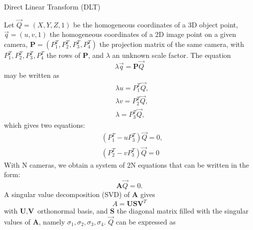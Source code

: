 \begin{algorithm}[!ht]
      \caption{Direct Linear Transform (DLT)}\label{alg:dlt}
      \begin{algorithmic}[1]
          \STATEx Let \(\overrightarrow{Q} = (X, Y, Z, 1)\) be the homogeneous coordinates of a 3D object point, 
          \STATEx \(\overrightarrow{q} = (u, v, 1)\) the homogeneous coordinates of a 2D image point on a given camera,
          \STATEx \(\textbf{P} = (P_1^T, P_2^T, P_3^T, P_4^T)\) the projection matrix of the same camera, with \(P_1^T, P_2^T, P_3^T, P_4^T\) the rows of \textbf{P}, and \(\lambda\) an unknown scale factor. 
          \STATE The equation
            \begin{equation}
              \lambda \overrightarrow{q} = \bm{P} \overrightarrow{Q}
            \end{equation}
            may be written as
            \begin{equation}
              \begin{aligned}
              &\lambda u = P_1^T \overrightarrow{Q},\\
              &\lambda v = P_2^T \overrightarrow{Q},\\
              &\lambda = P_3^T \overrightarrow{Q},
              \end{aligned}
            \end{equation}
            which gives two equations:
            \begin{equation}\label{eq:dlt}
              \begin{aligned}
              &(P_1^T - u P_3^T) \overrightarrow{Q} = 0,\\
              &(P_2^T - v P_3^T) \overrightarrow{Q} = 0
              \end{aligned}
            \end{equation}
      \STATE With N cameras, we obtain a system of 2N equations that can be written in the form:
      \begin{equation}
        \textbf{A} \overrightarrow{Q} = 0.
      \end{equation}
      \STATE A singular value decomposition (SVD) of \textbf{A} gives 
      \begin{equation}
        A = \textbf{U} \textbf{S} \textbf{V}^T
      \end{equation}
      with \(\textbf{U}, \textbf{V}\) orthonormal basis, and \(\textbf{S}\) the diagonal matrix filled with the singular values of \textbf{A}, namely \(\sigma_1, \sigma_2, \sigma_3, \sigma_4\). \(\overrightarrow{Q}\) can be expressed as 

\end{algorithmic}
\end{algorithm}

